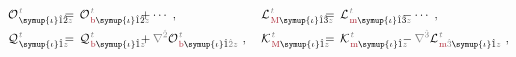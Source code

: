 \begin{subequations} \label{eq:multipole-modify}
\begin{align}
	&{\mathcal{O}}^{\;\!\mathcolor{gray}{t}}_{\;\! \symup{\iota}\hat{1}\hat{2} \mathcolor{gray}{z}} \hspace{-2.0em}&&=\hspace{0.2em} {\mathcal{O}}^{\;\!\mathcolor{gray}{t}}_{\;\!\textcolor{Maroon}{\text{b}} \symup{\iota}\hat{1}\hat{2} \mathcolor{gray}{z}} &&\hspace{-2.0em}+ \cdots~, &&\hspace{0.3em} {\mathcal{L}}^{\;\!\mathcolor{gray}{t}}_{\;\!\textcolor{Maroon}{\text{M}} \symup{\iota}\hat{1}\hat{3} \mathcolor{gray}{z}} \hspace{-2.0em}&&=\hspace{0.2em} {\mathcal{L}}^{\;\!\mathcolor{gray}{t}}_{\;\!\textcolor{Maroon}{\text{m}} \symup{\iota}\hat{1}\hat{3} \mathcolor{gray}{z}} &&\hspace{-2.0em}- \cdots~, \label{eq:Ob-LM} \\
	&{\mathcal{Q}}^{\;\!\mathcolor{gray}{t}}_{\;\! \symup{\iota}\hat{1} \mathcolor{gray}{z}} \hspace{-2.0em}&&=\hspace{0.2em} {\mathcal{Q}}^{\;\!\mathcolor{gray}{t}}_{\;\!\textcolor{Maroon}{\text{b}} \symup{\iota}\hat{1} \mathcolor{gray}{z}} &&\hspace{-2.0em}+ \mathcolor{gray}{\nabla^{\hat{2}}} {\mathcal{O}}^{\;\!\mathcolor{gray}{t}}_{\;\!\textcolor{Maroon}{\text{b}} \symup{\iota} \hat{1} \mathcolor{gray}{\hat{2}} \mathcolor{gray}{z}}~,  &&\hspace{0.3em} {\mathcal{K}}^{\;\!\mathcolor{gray}{t}}_{\;\!\textcolor{Maroon}{\text{M}} \symup{\iota}\hat{1} \mathcolor{gray}{z}} \hspace{-2.0em}&&=\hspace{0.2em} {\mathcal{K}}^{\;\!\mathcolor{gray}{t}}_{\;\!\textcolor{Maroon}{\text{m}} \symup{\iota}\hat{1} \mathcolor{gray}{z}} &&\hspace{-2.0em}- \mathcolor{gray}{\nabla^{\hat{3}}} {\mathcal{L}}^{\;\!\mathcolor{gray}{t}}_{\;\!\textcolor{Maroon}{\text{m}} \mathcolor{gray}{\hat{3}} \symup{\iota}\hat{1} \mathcolor{gray}{z}}~, \label{eq:Qb-KM} \\

\end{align}
\end{subequations}
